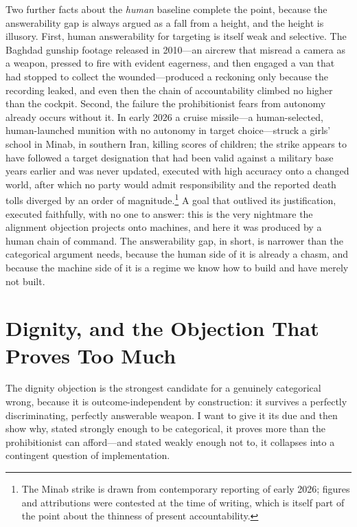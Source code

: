 \documentclass[11pt]{article}
\begin{document}
Two further facts about the \emph{human} baseline complete the point, because the answerability gap is always argued as a fall from a height, and the height is illusory. First, human answerability for targeting is itself weak and selective. The Baghdad gunship footage released in 2010---an aircrew that misread a camera as a weapon, pressed to fire with evident eagerness, and then engaged a van that had stopped to collect the wounded---produced a reckoning only because the recording leaked, and even then the chain of accountability climbed no higher than the cockpit. Second, the failure the prohibitionist fears from autonomy already occurs without it. In early 2026 a cruise missile---a human-selected, human-launched munition with no autonomy in target choice---struck a girls' school in Minab, in southern Iran, killing scores of children; the strike appears to have followed a target designation that had been valid against a military base years earlier and was never updated, executed with high accuracy onto a changed world, after which no party would admit responsibility and the reported death tolls diverged by an order of magnitude.\footnote{The Minab strike is drawn from contemporary reporting of early 2026; figures and attributions were contested at the time of writing, which is itself part of the point about the thinness of present accountability.} A goal that outlived its justification, executed faithfully, with no one to answer: this is the very nightmare the alignment objection projects onto machines, and here it was produced by a human chain of command. The answerability gap, in short, is narrower than the categorical argument needs, because the human side of it is already a chasm, and because the machine side of it is a regime we know how to build and have merely not built.

\section{Dignity, and the Objection That Proves Too Much}
\label{sec:dignity}

The dignity objection is the strongest candidate for a genuinely categorical wrong, because it is outcome-independent by construction: it survives a perfectly discriminating, perfectly answerable weapon. I want to give it its due and then show why, stated strongly enough to be categorical, it proves more than the prohibitionist can afford---and stated weakly enough not to, it collapses into a contingent question of implementation.
\end{document}
